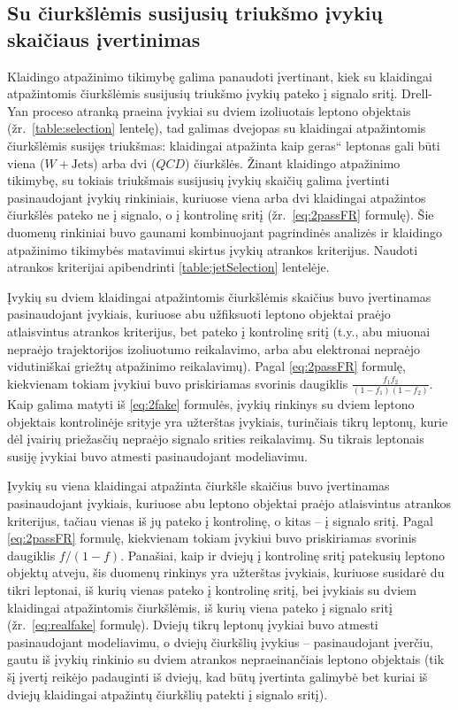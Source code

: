 \documentclass[a4paper, 12pt, oneside]{article}
\newcommand{\WJets}{W\! +\!\mathrm{Jets}}
\newcommand{\ltq}[1]{{\quotedblbase{}#1\textquotedblleft{}}}
\newcommand{\QCD}{QC\! D}
\newlength\q
\begin{document}
\subsection{Su čiurkšlėmis susijusių triukšmo įvykių skaičiaus įvertinimas} \label{sec:bkgEst}
Klaidingo atpažinimo tikimybę galima panaudoti įvertinant, kiek su klaidingai atpažintomis čiurkšlėmis susijusių
triukšmo įvykių pateko į signalo sritį.
Drell-Yan proceso atranką praeina įvykiai su dviem izoliuotais leptono objektais (žr.\ \ref{table:selection} lentelę),
tad galimas dvejopas su klaidingai atpažintomis čiurkšlėmis susijęs triukšmas: klaidingai atpažinta kaip \ltq{geras}
leptonas gali būti viena ($\WJets$) arba dvi ($\QCD$) čiurkšlės.
Žinant klaidingo atpažinimo tikimybę, su tokiais triukšmais susijusių įvykių skaičių galima įvertinti pasinaudojant įvykių
rinkiniais, kuriuose viena arba dvi klaidingai atpažintos čiurkšlės pateko ne į signalo, o į kontrolinę sritį
(žr.\ \eqref{eq:2passFR} formulę).
Šie duomenų rinkiniai buvo gaunami kombinuojant pagrindinės analizės ir klaidingo atpažinimo tikimybės matavimui skirtus
įvykių atrankos kriterijus.
Naudoti atrankos kriterijai apibendrinti \ref{table:jetSelection} lentelėje.

Įvykių su dviem klaidingai atpažintomis čiurkšlėmis skaičius buvo įvertinamas pasinaudojant įvykiais, kuriuose abu užfiksuoti
leptono objektai praėjo atlaisvintus atrankos kriterijus, bet pateko į kontrolinę sritį (t.y., abu miuonai nepraėjo trajektorijos
izoliuotumo reikalavimo, arba abu elektronai nepraėjo vidutiniškai griežtų atpažinimo reikalavimų).
Pagal \eqref{eq:2passFR} formulę, kiekvienam tokiam įvykiui buvo priskiriamas svorinis daugiklis $\frac{f_1 f_2}{(1-f_1)(1-f_2)}$.
Kaip galima matyti iš \eqref{eq:2fake} formulės, įvykių rinkinys su dviem leptono objektais kontrolinėje srityje yra užterštas įvykiais,
turinčiais tikrų leptonų, kurie dėl įvairių priežasčių nepraėjo signalo srities reikalavimų.
Su tikrais leptonais susiję įvykiai buvo atmesti pasinaudojant modeliavimu.

Įvykių su viena klaidingai atpažinta čiurkšle skaičius buvo įvertinamas pasinaudojant įvykiais, kuriuose abu leptono objektai
praėjo atlaisvintus atrankos kriterijus, tačiau vienas iš jų pateko į kontrolinę, o kitas -- į signalo sritį.
Pagal \eqref{eq:2passFR} formulę, kiekvienam tokiam įvykiui buvo priskiriamas svorinis daugiklis $f/(1-f)$.
Panašiai, kaip ir dviejų į kontrolinę sritį patekusių leptono objektų atveju, šis duomenų rinkinys yra užterštas įvykiais,
kuriuose susidarė du tikri leptonai, iš kurių vienas pateko į kontrolinę sritį, bei įvykiais su dviem klaidingai atpažintomis
čiurkšlėmis, iš kurių viena pateko į signalo sritį (žr.\ \ref{eq:realfake} formulę).
Dviejų tikrų leptonų įvykiai buvo atmesti pasinaudojant modeliavimu, o dviejų čiurkšlių įvykius -- pasinaudojant įverčiu, gautu
iš įvykių rinkinio su dviem atrankos nepraeinančiais leptono objektais (tik šį įvertį reikėjo padauginti iš dviejų, kad būtų
įvertinta galimybė bet kuriai iš dviejų klaidingai atpažintų čiurkšlių patekti į signalo sritį).
\end{document}
